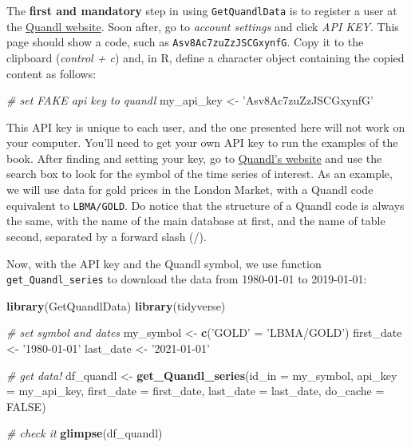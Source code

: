 \documentclass[
  12pt,
]{book}
\newenvironment{Shaded}{\begin{snugshade}}{\end{snugshade}}
\newcommand{\CommentTok}[1]{\textcolor[rgb]{0.37,0.37,0.37}{\textit{#1}}}
\newcommand{\DataTypeTok}[1]{\textcolor[rgb]{0.27,0.27,0.27}{#1}}
\newcommand{\KeywordTok}[1]{\textcolor[rgb]{0.27,0.27,0.27}{\textbf{#1}}}
\newcommand{\NormalTok}[1]{#1}
\newcommand{\OtherTok}[1]{\textcolor[rgb]{0.37,0.37,0.37}{#1}}
\newcommand{\StringTok}[1]{\textcolor[rgb]{0.5,0.5,0.5}{#1}}
\begin{document}
The \textbf{first and mandatory} step in using \texttt{GetQuandlData} is to register a user at the \href{https://www.quandl.com/}{Quandl website}. Soon after, go to \emph{account settings} and click \emph{API KEY}. This page should show a code, such as \texttt{Asv8Ac7zuZzJSCGxynfG}. Copy it to the clipboard (\emph{control + c}) and, in R, define a character object containing the copied content as follows:

\begin{Shaded}
\begin{Highlighting}[]
\CommentTok{# set FAKE api key to quandl}
\NormalTok{my_api_key <-}\StringTok{ 'Asv8Ac7zuZzJSCGxynfG'}
\end{Highlighting}
\end{Shaded}

This API key is unique to each user, and the one presented here will not work on your computer. You'll need to get your own API key to run the examples of the book. After finding and setting your key, go to \href{https://www.quandl.com/search?query=}{Quandl's website} and use the search box to look for the symbol of the time series of interest. As an example, we will use data for gold prices in the London Market, with a Quandl code equivalent to \texttt{\textquotesingle{}LBMA/GOLD\textquotesingle{}}. Do notice that the structure of a Quandl code is always the same, with the name of the main database at first, and the name of table second, separated by a forward slash (/).

Now, with the API key and the Quandl symbol, we use function \texttt{get\_Quandl\_series} to download the data from 1980-01-01 to 2019-01-01:  

\begin{Shaded}
\begin{Highlighting}[]
\KeywordTok{library}\NormalTok{(GetQuandlData)}
\KeywordTok{library}\NormalTok{(tidyverse)}

\CommentTok{# set symbol and dates}
\NormalTok{my_symbol <-}\StringTok{ }\KeywordTok{c}\NormalTok{(}\StringTok{'GOLD'}\NormalTok{ =}\StringTok{ 'LBMA/GOLD'}\NormalTok{)}
\NormalTok{first_date <-}\StringTok{ '1980-01-01'}
\NormalTok{last_date <-}\StringTok{ '2021-01-01'}

\CommentTok{# get data!}
\NormalTok{df_quandl <-}\StringTok{ }\KeywordTok{get_Quandl_series}\NormalTok{(}\DataTypeTok{id_in =}\NormalTok{ my_symbol,}
                               \DataTypeTok{api_key =}\NormalTok{ my_api_key, }
                               \DataTypeTok{first_date =}\NormalTok{ first_date,}
                               \DataTypeTok{last_date =}\NormalTok{ last_date, }
                               \DataTypeTok{do_cache =} \OtherTok{FALSE}\NormalTok{)}

\CommentTok{# check it}
\KeywordTok{glimpse}\NormalTok{(df_quandl)}
\end{Highlighting}
\end{Shaded}
\end{document}
